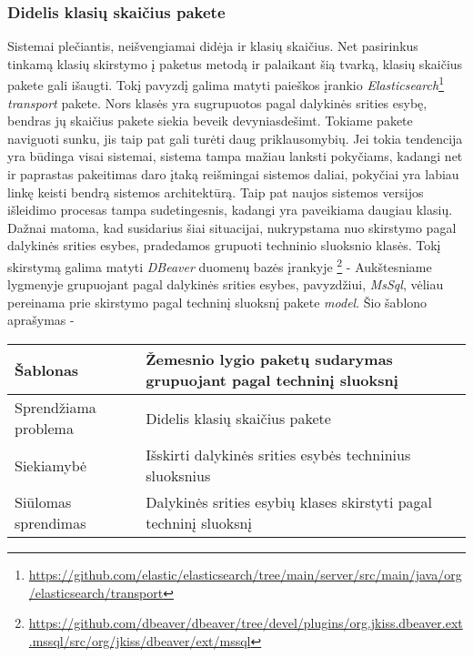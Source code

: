 \subsubsection{Didelis klasių skaičius pakete}
Sistemai plečiantis, neišvengiamai didėja ir klasių skaičius. Net pasirinkus tinkamą klasių skirstymo į paketus metodą
ir palaikant šią tvarką, klasių skaičius pakete gali išaugti. Tokį pavyzdį galima matyti paieškos įrankio \textit{Elasticsearch}\footnote{\url{https://github.com/elastic/elasticsearch/tree/main/server/src/main/java/org/elasticsearch/transport}}
\textit{transport} pakete. Nors klasės yra sugrupuotos pagal dalykinės srities esybę, bendras jų skaičius pakete siekia beveik devyniasdešimt.
Tokiame pakete naviguoti sunku, jis taip pat gali turėti daug priklausomybių.
Jei tokia tendencija yra būdinga visai sistemai, sistema tampa mažiau lanksti pokyčiams, kadangi net ir paprastas pakeitimas
daro įtaką reišmingai sistemos daliai, pokyčiai yra labiau linkę keisti bendrą sistemos architektūrą.
Taip pat naujos sistemos versijos išleidimo  procesas tampa sudetingesnis, kadangi yra paveikiama daugiau klasių.
Dažnai matoma, kad susidarius šiai situacijai, nukrypstama nuo skirstymo pagal dalykinės srities esybes, pradedamos grupuoti
techninio sluoksnio klasės. Tokį skirstymą galima matyti \textit{DBeaver} duomenų bazės įrankyje \footnote{\url{https://github.com/dbeaver/dbeaver/tree/devel/plugins/org.jkiss.dbeaver.ext.mssql/src/org/jkiss/dbeaver/ext/mssql}} -
Aukštesniame lygmenyje grupuojant pagal dalykinės srities esybes, pavyzdžiui, \textit{MsSql}, vėliau pereinama prie skirstymo
pagal techninį sluoksnį pakete \textit{model}.
Šio šablono aprašymas -
\begin{center}
    \begin{tabular}{|p{5cm}|p{10cm}|}
        \hline
        Šablonas &  Žemesnio lygio paketų sudarymas grupuojant pagal techninį sluoksnį \\ [0.5ex]
        \hline\hline
        Sprendžiama problema & Didelis klasių skaičius pakete\\
        \hline
        Siekiamybė &  Išskirti dalykinės srities esybės techninius sluoksnius \\
        \hline
        Siūlomas sprendimas & Dalykinės srities esybių klases skirstyti pagal techninį sluoksnį \\
        \hline
    \end{tabular}
\end{center}

